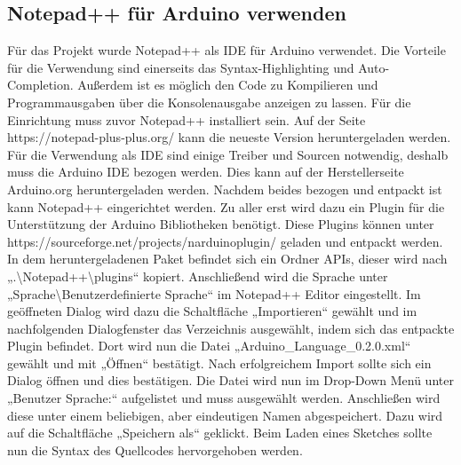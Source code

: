 \subsection{Notepad++ für Arduino verwenden}
Für das Projekt wurde Notepad++ als IDE für Arduino verwendet. Die Vorteile für die Verwendung sind einerseits das Syntax-Highlighting und Auto-Completion. Außerdem ist es möglich den Code zu Kompilieren und Programmausgaben über die Konsolenausgabe anzeigen zu lassen.
Für die Einrichtung muss zuvor Notepad++ installiert sein. Auf der Seite https://notepad-plus-plus.org/ kann die neueste Version heruntergeladen werden. Für die Verwendung als IDE sind einige Treiber und Sourcen notwendig, deshalb muss die Arduino IDE bezogen werden. Dies kann auf der Herstellerseite Arduino.org heruntergeladen werden. Nachdem beides bezogen und entpackt ist kann Notepad++ eingerichtet werden. Zu aller erst wird dazu ein Plugin für die Unterstützung der Arduino Bibliotheken benötigt. Diese Plugins können unter https://sourceforge.net/projects/narduinoplugin/ geladen und entpackt werden. In dem heruntergeladenen Paket befindet sich ein Ordner APIs, dieser wird nach „.\textbackslash{}Notepad++\textbackslash{}plugins“ kopiert. Anschließend wird die Sprache unter „Sprache\textbackslash{}Benutzerdefinierte Sprache“ im Notepad++ Editor eingestellt. Im geöffneten Dialog wird dazu die Schaltfläche „Importieren“ gewählt und im nachfolgenden Dialogfenster das Verzeichnis ausgewählt, indem sich das entpackte Plugin befindet. Dort wird nun die Datei „Arduino\_Language\_0.2.0.xml“ gewählt und mit „Öffnen“ bestätigt. Nach erfolgreichem Import sollte sich ein Dialog öffnen und dies bestätigen. Die Datei wird nun im Drop-Down Menü unter „Benutzer Sprache:“ aufgelistet und muss ausgewählt werden. Anschließen wird diese unter einem beliebigen, aber eindeutigen Namen abgespeichert. Dazu wird auf die Schaltfläche „Speichern als“ geklickt. Beim Laden eines Sketches sollte nun die Syntax des Quellcodes hervorgehoben werden.
